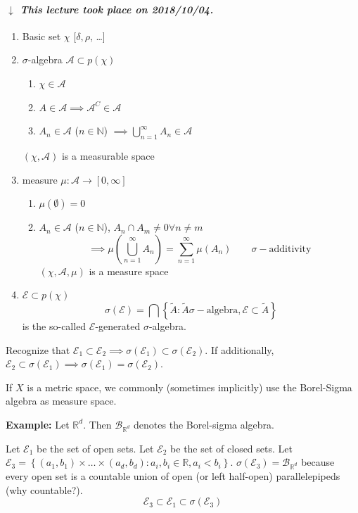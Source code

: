 \documentclass[a4paper]{article}
\numberwithin{lecref}{section}
\theoremstyle{break}
\newcommand{\dateref}[1]{%
  \begin{mdframed}[backgroundcolor=gray!10,innerbottommargin=0pt,innertopmargin=0pt]
    \paragraph{\textit{$\downarrow$ This lecture took place on #1.}}%
  \end{mdframed}%
}
\newcommand{\Set}[1]{\left\{#1\right\}}
\begin{document}

\dateref{2018/10/04}

\begin{enumerate}
  \item Basic set $\chi$ [$\delta, \rho$, \dots]
  \item $\sigma$-algebra $\mathcal A \subset p(\chi)$
    \begin{enumerate}
      \item $\chi \in \mathcal A$
      \item $A \in \mathcal A \implies \mathcal A^C \in \mathcal A$
      \item $A_n \in \mathcal A$ ($n \in \mathbb N$) $\implies \bigcup_{n=1}^\infty A_n \in \mathcal A$
    \end{enumerate}
    $(\chi, \mathcal A)$ is a measurable space
  \item measure $\mu: \mathcal A \to [0, \infty]$
    \begin{enumerate}
      \item $\mu(\emptyset) = 0$
      \item $A_n \in \mathcal A$ ($n \in \mathbb N$), $A_n \cap A_m \neq 0 \forall n \neq m$
        \[ \implies \mu\left(\bigcup_{n=1}^\infty A_n\right) = \sum_{n=1}^\infty \mu(A_n) \qquad \sigma-\text{additivity} \]
        $(\chi, \mathcal A, \mu)$ is a measure space
    \end{enumerate}
  \item ${\mathcal E} \subset p(\chi)$
    \[ \sigma({\mathcal E}) = \bigcap \Set{\tilde A: \tilde A \sigma-\text{algebra}, {\mathcal E} \subset \tilde{A}} \]
    is the so-called ${\mathcal E}$-generated $\sigma$-algebra.
\end{enumerate}
Recognize that ${\mathcal E}_1 \subset {\mathcal E}_2 \implies \sigma({\mathcal E}_1) \subset \sigma({\mathcal E}_2)$.
If additionally, ${\mathcal E}_2 \subset \sigma({\mathcal E}_1) \implies \sigma({\mathcal E}_1) = \sigma({\mathcal E}_2)$.

If $X$ is a metric space, we commonly (sometimes implicitly) use the Borel-Sigma algebra as measure space.

\textbf{Example:}
Let $\mathbb R^d$. Then $\mathcal B_{\mathbb R^d}$ denotes the Borel-sigma algebra.

Let ${\mathcal E}_1$ be the set of open sets. Let ${\mathcal E}_2$ be the set of closed sets.
Let ${\mathcal E}_3 = \Set{(a_1, b_1) \times \dots \times (a_d, b_d): a_i, b_i \in \mathbb R, a_i < b_i}$.
$\sigma(\mathcal E_3) = \mathcal B_{\mathbb R^d}$ because every open set is a countable union of open (or left half-open) parallelepipeds (why countable?).
\[ \mathcal E_3 \subset \mathcal E_1 \subset \sigma(\mathcal E_3) \]
\end{document}
